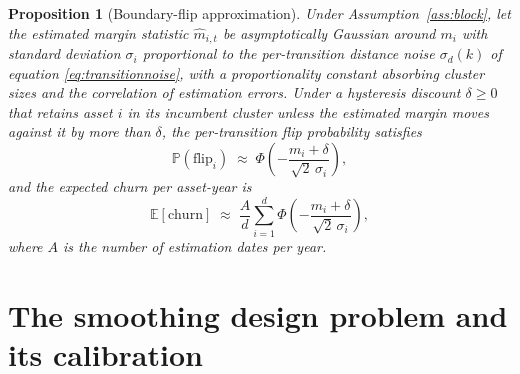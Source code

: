 \documentclass{rQUF2e}
\theoremstyle{plain}
\newtheorem{proposition}{Proposition}
\theoremstyle{remark}
\newcommand{\E}{\mathbb{E}}
\newcommand{\Prob}{\mathbb{P}}
\begin{document}
\begin{proposition}[Boundary-flip approximation]
\label{prop:flip}
Under Assumption~\ref{ass:block}, let the estimated margin statistic
$\widehat{m}_{i,t}$ be asymptotically Gaussian around $m_i$ with standard
deviation $\sigma_i$ proportional to the per-transition distance noise
$\sigma_d(k)$ of equation \eqref{eq:transitionnoise}, with a proportionality
constant absorbing cluster sizes and the correlation of estimation errors.
Under a hysteresis discount $\delta \geq 0$ that retains asset $i$ in its
incumbent cluster unless the estimated margin moves against it by more than
$\delta$, the per-transition flip probability satisfies
\begin{equation}
\Prob\!\left(\text{flip}_i\right)
\;\approx\; \Phi\!\left( - \frac{m_i + \delta}{\sqrt{2}\,\sigma_i} \right),
\label{eq:flipprob}
\end{equation}
and the expected churn per asset-year is
\begin{equation}
\E\!\left[\text{churn}\right]
\;\approx\; \frac{A}{d} \sum_{i=1}^{d}
\Phi\!\left( - \frac{m_i + \delta}{\sqrt{2}\,\sigma_i} \right),
\label{eq:expectedchurn}
\end{equation}
where $A$ is the number of estimation dates per year.
\end{proposition}


\section{The smoothing design problem and its calibration}
\label{sec:smoothing}
\end{document}
